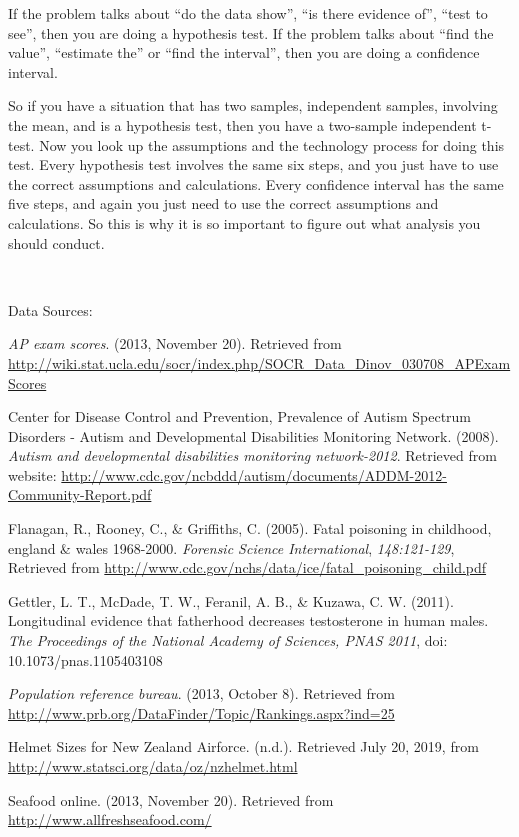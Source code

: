 \documentclass[]{book}
\begin{document}
If the problem talks about ``do the data show'', ``is there evidence of'', ``test to see'', then you are doing a hypothesis test. If the problem talks about ``find the value'', ``estimate the'' or ``find the interval'', then you are doing a confidence interval.

So if you have a situation that has two samples, independent samples, involving the mean, and is a hypothesis test, then you have a two-sample independent t-test. Now you look up the assumptions and the technology process for doing this test. Every hypothesis test involves the same six steps, and you just have to use the correct assumptions and calculations. Every confidence interval has the same five steps, and again you just need to use the correct assumptions and calculations. So this is why it is so important to figure out what analysis you should conduct.

\textbf{\\
}

Data Sources:

\emph{AP exam scores}. (2013, November 20). Retrieved from
\url{http://wiki.stat.ucla.edu/socr/index.php/SOCR_Data_Dinov_030708_APExamScores}

Center for Disease Control and Prevention, Prevalence of Autism Spectrum
Disorders - Autism and Developmental Disabilities Monitoring Network.
(2008). \emph{Autism and developmental disabilities monitoring network-2012}.
Retrieved from website:
\url{http://www.cdc.gov/ncbddd/autism/documents/ADDM-2012-Community-Report.pdf}

Flanagan, R., Rooney, C., \& Griffiths, C. (2005). Fatal poisoning in
childhood, england \& wales 1968-2000. \emph{Forensic Science International},
\emph{148:121-129}, Retrieved from
\url{http://www.cdc.gov/nchs/data/ice/fatal_poisoning_child.pdf}

Gettler, L. T., McDade, T. W., Feranil, A. B., \& Kuzawa, C. W. (2011).
Longitudinal evidence that fatherhood decreases testosterone in human
males. \emph{The Proceedings of the National Academy of Sciences, PNAS 2011},
doi: 10.1073/pnas.1105403108

\emph{Population reference bureau}. (2013, October 8). Retrieved from
\url{http://www.prb.org/DataFinder/Topic/Rankings.aspx?ind=25}

Helmet Sizes for New Zealand Airforce. (n.d.). Retrieved July 20, 2019, from \url{http://www.statsci.org/data/oz/nzhelmet.html}

Seafood online. (2013, November 20). Retrieved from \url{http://www.allfreshseafood.com/}
\end{document}
